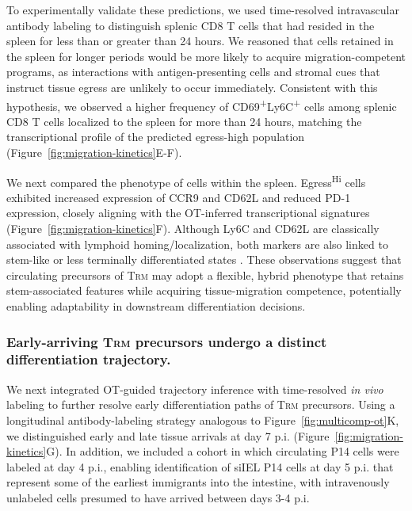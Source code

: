 To experimentally validate these predictions, we used time-resolved intravascular antibody labeling to distinguish splenic CD8 T cells that had resided in the spleen for less than or greater than 24 hours. We reasoned that cells retained in the spleen for longer periods would be more likely to acquire migration-competent programs, as interactions with antigen-presenting cells and stromal cues that instruct tissue egress are unlikely to occur immediately. Consistent with this hypothesis, we observed a higher frequency of CD69\textsuperscript{+}Ly6C\textsuperscript{+} cells among splenic CD8 T cells localized to the spleen for more than 24 hours, matching the transcriptional profile of the predicted egress-high population (Figure~\ref{fig:migration-kinetics}E-F).

We next compared the phenotype of cells within the spleen. Egress\textsuperscript{Hi} cells exhibited increased expression of CCR9 and CD62L and reduced PD-1 expression, closely aligning with the OT-inferred transcriptional signatures (Figure~\ref{fig:migration-kinetics}F). Although Ly6C and CD62L are classically associated with lymphoid homing/localization, both markers are also linked to stem-like or less terminally differentiated states \citep{walunasLy6CMarkerMemory1995, hanninenLy6CSupportsPreferential2011}. These observations suggest that circulating precursors of T\textsc{rm} may adopt a flexible, hybrid phenotype that retains stem-associated features while acquiring tissue-migration competence, potentially enabling adaptability in downstream differentiation decisions.

\subsubsection{Early-arriving T\textsc{rm} precursors undergo a distinct differentiation trajectory.}

We next integrated OT-guided trajectory inference with time-resolved \emph{in vivo} labeling to further resolve early differentiation paths of T\textsc{rm} precursors. Using a longitudinal antibody-labeling strategy analogous to Figure~\ref{fig:multicomp-ot}K, we distinguished early and late tissue arrivals at day 7 p.i. (Figure~\ref{fig:migration-kinetics}G). In addition, we included a cohort in which circulating P14 cells were labeled at day 4 p.i., enabling identification of siIEL P14 cells at day 5 p.i. that represent some of the earliest immigrants into the intestine, with intravenously unlabeled cells presumed to have arrived between days 3-4 p.i.

